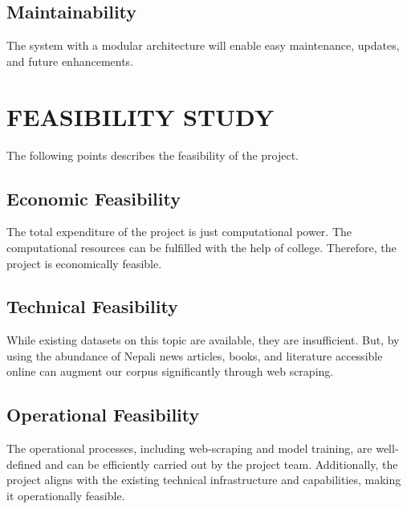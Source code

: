             \subsection{Maintainability}            
            The system with a modular architecture will enable easy maintenance, updates, and future enhancements.


        \section{FEASIBILITY STUDY}
            The following points describes the feasibility of the project.

            \subsection{Economic Feasibility}
                The total expenditure of the project is just computational power. The computational resources can be fulfilled with the help of college. Therefore, the project is economically feasible.

            \subsection{Technical Feasibility}
                While existing datasets on this topic are available, they are insufficient. But, by using the abundance of Nepali news articles, books, and literature accessible online can augment our corpus significantly through web scraping.

            \subsection{Operational Feasibility}
                The operational processes, including web-scraping and model training, are well-defined and can be efficiently carried out by the project team. Additionally, the project aligns with the existing technical infrastructure and capabilities, making it operationally feasible.